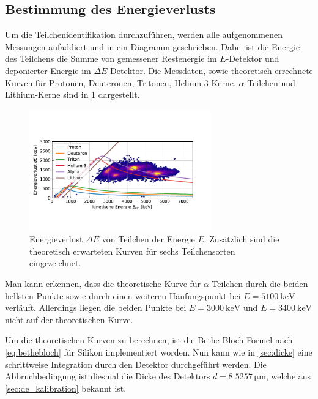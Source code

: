 \subsection{Bestimmung des Energieverlusts}

Um die Teilchenidentifikation durchzuführen, werden alle aufgenommenen Messungen aufaddiert und in ein Diagramm geschrieben.
Dabei ist die Energie des Teilchens die Summe von gemessener Restenergie im $E$-Detektor und deponierter Energie im $\Delta E$-Detektor.
Die Messdaten, sowie theoretisch errechnete Kurven für Protonen, Deuteronen, Tritonen, Helium-3-Kerne, $\alpha$-Teilchen und Lithium-Kerne sind in \cref{fig:energieverlust} dargestellt.

\begin{figure}[ht]
	\centering
	\includegraphics[width=0.7\textwidth]{dat/energieverlust.pdf}
	\caption{Energieverlust $\Delta E$ von Teilchen der Energie $E$. Zusätzlich sind die theoretisch erwarteten Kurven für sechs Teilchensorten eingezeichnet.}
	\label{fig:energieverlust}
\end{figure}

Man kann erkennen, dass die theoretische Kurve für $\alpha$-Teilchen durch die beiden hellsten Punkte sowie durch einen weiteren Häufungspunkt bei $E=\SI{5100}{\kilo\electronvolt}$ verläuft.
Allerdings liegen die beiden Punkte bei $E = \SI{3000}{\kilo\electronvolt}$ und $E=\SI{3400}{\kilo\electronvolt}$ nicht auf der theoretischen Kurve.

Um die theoretischen Kurven zu berechnen, ist die Bethe Bloch Formel nach \cref{eq:bethebloch} für Silikon implementiert worden.
Nun kann wie in \cref{sec:dicke} eine schrittweise Integration durch den Detektor durchgeführt werden.
Die Abbruchbedingung ist diesmal die Dicke des Detektors $d = \SI{8.5257}{\micro\meter}$, welche aus \cref{sec:de_kalibration} bekannt ist. %
